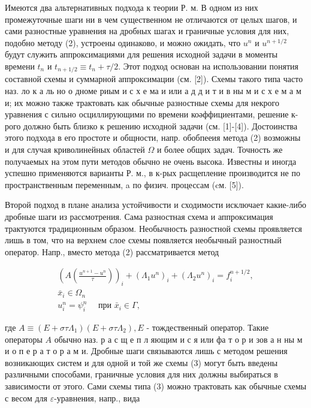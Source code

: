 \documentclass[10pt]{article}
\begin{document}
Имеются два альтернативных подхода к теории Р. м. В одном из них промежуточные шаги ни в чем существенном не отличаются от целых шагов, и сами разностные уравнения на дробных шагах и граничные условия для них, подобно методу (2), устроены одинаково, и можно ожидать, что $u^{n}$ и $u^{n+1 / 2}$ будут служить аппроксимациями для решения исходной задачи в моменты времени $t_{n}$ и $t_{n+1 / 2} \equiv t_{n}+\tau / 2$. Этот подход основан на использовании понятия составной схемы и суммарной аппроксимации (см. [2]). Схемы такого типа часто наз. ло к а ль но о дноме риым и с х е ма и или а д д и т и в ны м и с х е м а м и; их можно также трактовать как обычные разностные схемы для некрого уравнения с сильно осциллирующими по времени коәффициентами, решение к-рого должно быть близко к решению исходной задачи (см. [1]-[4]). Достоинства этого подхода в его простоте и общности, напр. обобпееия метода (2) возможны и для случая криволинейных областей $\Omega$ и более общих задач. Точность же получаемых на этом пути методов обычно не очень высока. Известны и иногда успешно применяются варианты Р. м., в к-рых расщепление производится не по пространственным переменным, a по физич. процессам (cм. [5]).



Второй подход в плане анализа устойчивости и сходимости исключает какие-либо дробные шаги из рассмотрения. Сама разностная схема и аппроксимация трактуются традиционным образом. Необычность разностной схемы проявляется лишь в том, что на верхнем слое схемы появляется необычный разностный оператор. Напр., вместо метода (2) рассматривается метод



\[

\begin{gathered}

\left(A\left(\frac{u^{n+1}-u^{n}}{\tau}\right)\right)_{i}+\left(\Lambda_{1} u^{n}\right)_{i}+\left(\Lambda_{2} u^{n}\right)_{i}=f_{i}^{n+1 / 2}, \\

\bar{x}_{i} \in \Omega_{n} \\

u_{i}^{n}=\psi_{i}^{n} \quad \text { при } \bar{x}_{i} \in \Gamma,

\end{gathered}

\]



где $A \equiv\left(E+\sigma \tau \Lambda_{1}\right)\left(E+\sigma \tau \Lambda_{2}\right), E$ - тождественный оператор. Такие операторы $A$ обычно наз. р а с щ е п л яющим и с я или фа т о р и зов а н ны м и о п е р а т о р а м и. Дробные шаги связываются лишь с методом решения возникающих систем и для одной и той же схемы (3) могут быть введены различными способами, граничные условия для них должны выбираться в зависимости от этого. Сами схемы типа (3) можно трактовать как обычные схемы с весом для $\varepsilon$-уравнения, напр., вида
\end{document}
